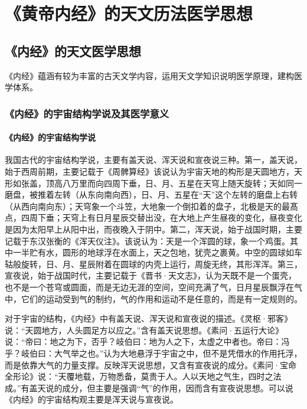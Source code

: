 \documentclass[draft,12pt]{ctexbook}
\begin{document}
\pagestyle{main}
\fi
\chapter{《黄帝内经》的天文历法医学思想}%

\section{《内经》的天文医学思想}%

《内经》蕴涵有较为丰富的古天文学内容，运用天文学知识说明医学原理，建构医学体系。

\subsection{《内经》的宇宙结构学说及其医学意义}%

\subsubsection{《内经》的宇宙结构学说}%

我国古代的宇宙结构学说，主要有盖天说、浑天说和宣夜说三种。第一，盖天说，始于西周前期，主要记载于《周髀算经》该说认为宇宙天地的构形是天圆地方，天形如张盖，顶高八万里而向四周下垂，日、月、五星在天穹上随天旋转；天如同一磨盘，被推着左转（从东向南向西），日、月、五星在“天”这个左转的磨盘上右转（从西向南向东）；天穹象一个斗笠，大地象一个倒扣着的盘子，北极是天的最髙点，四周下垂；天穹上有日月星辰交替出没，在大地上产生昼夜的变化，昼夜变化是因为太阳早上从阳中出，而夜晚入于阴中。第二，浑天说，始于战国时期，主要记载于东汉张衡的《浑天仪注》。该说认为：天是一个浑圆的球，象一个鸡蛋。其中一半贮有水，圆形的地球浮在水面上，天之包地，犹壳之裹黄。中空的圆球如车轱般旋转，日、月、星辰附着在圆球的内壳上运行，周旋无终，其形浑浑。第三，宣夜说，始于战国时代，主要记载于《晋书·天文志》，认为天既不是一个蛋壳，也不是一个苍穹或圆面，而是无边无涯的空间，空间充满了气，日月星辰飘浮在气中，它们的运动受到气的制约，气的作用和运动不是任意的，而是有一定规则的。

对于宇宙的结构，《内经》中有盖天说、浑天说和宣夜说的描述。《灵枢·邪客》说：“天圆地方，人头圆足方以应之。”含有盖天说思想。《素问·五运行大论》说：“帝曰：地之为下，否乎？岐伯曰：地为人之下，太虚之中者也。帝曰：冯乎？岐伯曰：大气举之也。”认为大地悬浮于宇宙之中，但不是凭借水的作用托浮，而是依靠大气的力量支撑。反映浑天说思想，又含有宣夜说的成分。《素问·宝命全形论》说：“天覆地载，万物悉备，莫贵于人。人以天地之气生，四时之法成。”有盖天说的成分，但主要是强调“气”的作用，因而含有宣夜说思想。可以说《内经》的宇宙结构观主要是浑天说与宣夜说。
\end{document}
